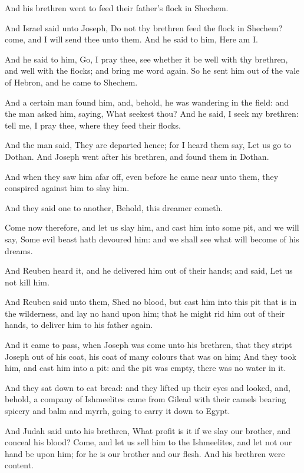 \verse And his brethren went to feed their father's flock in Shechem.

\verse And Israel said unto Joseph, Do not thy brethren feed the flock in Shechem? come, and I will send thee unto them. And he said to him, Here am I.

\verse And he said to him, Go, I pray thee, see whether it be well with thy brethren, and well with the flocks; and bring me word again. So he sent him out of the vale of Hebron, and he came to Shechem.

\verse And a certain man found him, and, behold, he was wandering in the field: and the man asked him, saying, What seekest thou?  \verse And he said, I seek my brethren: tell me, I pray thee, where they feed their flocks.

\verse And the man said, They are departed hence; for I heard them say, Let us go to Dothan. And Joseph went after his brethren, and found them in Dothan.

\verse And when they saw him afar off, even before he came near unto them, they conspired against him to slay him.

\verse And they said one to another, Behold, this dreamer cometh.

\verse Come now therefore, and let us slay him, and cast him into some pit, and we will say, Some evil beast hath devoured him: and we shall see what will become of his dreams.

\verse And Reuben heard it, and he delivered him out of their hands; and said, Let us not kill him.

\verse And Reuben said unto them, Shed no blood, but cast him into this pit that is in the wilderness, and lay no hand upon him; that he might rid him out of their hands, to deliver him to his father again.

\verse And it came to pass, when Joseph was come unto his brethren, that they stript Joseph out of his coat, his coat of many colours that was on him; \verse And they took him, and cast him into a pit: and the pit was empty, there was no water in it.

\verse And they sat down to eat bread: and they lifted up their eyes and looked, and, behold, a company of Ishmeelites came from Gilead with their camels bearing spicery and balm and myrrh, going to carry it down to Egypt.

\verse And Judah said unto his brethren, What profit is it if we slay our brother, and conceal his blood?  \verse Come, and let us sell him to the Ishmeelites, and let not our hand be upon him; for he is our brother and our flesh. And his brethren were content.

